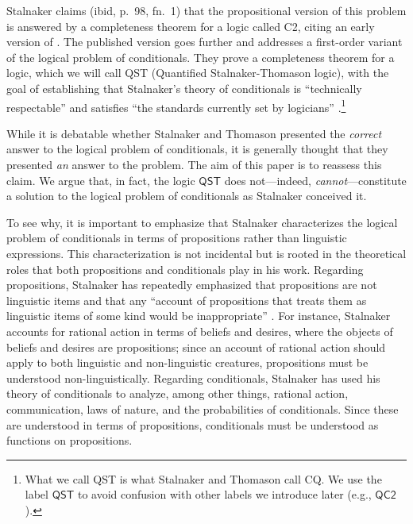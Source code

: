 \documentclass[12pt]{article}
\begin{document}
Stalnaker claims (ibid, p.\ 98, fn.\ 1) that the propositional version of this problem is answered by a completeness theorem for a logic called \textsf{C2}, citing an early version of \cite{StalnakerThomason1970}. 
The published version goes further and addresses a first-order variant of the logical problem of conditionals.
They prove a completeness theorem for a logic, which we will call \textsf{QST} (Quantified Stalnaker-Thomason logic), with the goal of establishing that Stalnaker's theory of conditionals is ``technically respectable'' and satisfies ``the standards currently set by logicians'' \parencite[41]{StalnakerThomason1970}.\footnote{What we call \textsf{QST} is what Stalnaker and Thomason call \textsf{CQ}. We use the label $\mathsf{QST}$ to avoid confusion with other labels we introduce later (e.g., $\mathsf{QC2}$).}

While it is debatable whether Stalnaker and Thomason presented the \emph{correct} answer to the logical problem of conditionals, it is generally thought that they presented \emph{an} answer to the problem. 
The aim of this paper is to reassess this claim. 
We argue that, in fact, the logic $\mathsf{QST}$ does not---indeed, \emph{cannot}---constitute a solution to the logical problem of conditionals as Stalnaker conceived it. 

To see why, it is important to emphasize that Stalnaker characterizes the logical problem of conditionals in terms of propositions rather than linguistic expressions. 
This characterization is not incidental but is rooted in the theoretical roles that both propositions and conditionals play in his work.
Regarding propositions, Stalnaker has repeatedly emphasized that propositions are not linguistic items and that any ``account of propositions that treats them as linguistic items of some kind would be inappropriate'' \parencite[pp.\ 82--83]{stalnaker1976propositions}. For instance, Stalnaker accounts for rational action in terms of beliefs and desires, where the objects of beliefs and desires are propositions; since an account of rational action should apply to both linguistic and non-linguistic creatures, propositions must be understood non-linguistically. Regarding conditionals, Stalnaker has used his theory of conditionals to analyze, among other things, rational action, communication, laws of nature, and the probabilities of conditionals. Since these are understood in terms of propositions, conditionals must be understood as functions on propositions.
\end{document}

